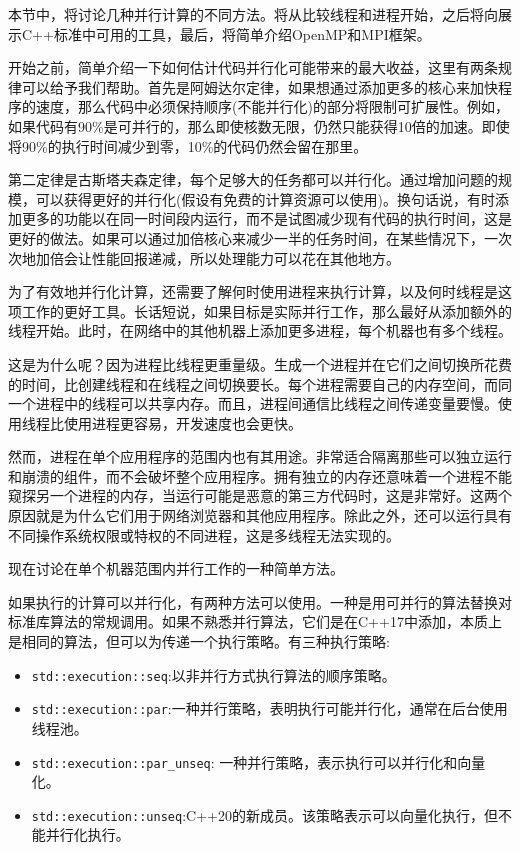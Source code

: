 
本节中，将讨论几种并行计算的不同方法。将从比较线程和进程开始，之后将向展示C++标准中可用的工具，最后，将简单介绍OpenMP和MPI框架。

开始之前，简单介绍一下如何估计代码并行化可能带来的最大收益，这里有两条规律可以给予我们帮助。首先是阿姆达尔定律，如果想通过添加更多的核心来加快程序的速度，那么代码中必须保持顺序(不能并行化)的部分将限制可扩展性。例如，如果代码有90\%是可并行的，那么即使核数无限，仍然只能获得10倍的加速。即使将90\%的执行时间减少到零，10\%的代码仍然会留在那里。

第二定律是古斯塔夫森定律，每个足够大的任务都可以并行化。通过增加问题的规模，可以获得更好的并行化(假设有免费的计算资源可以使用)。换句话说，有时添加更多的功能以在同一时间段内运行，而不是试图减少现有代码的执行时间，这是更好的做法。如果可以通过加倍核心来减少一半的任务时间，在某些情况下，一次次地加倍会让性能回报递减，所以处理能力可以花在其他地方。


为了有效地并行化计算，还需要了解何时使用进程来执行计算，以及何时线程是这项工作的更好工具。长话短说，如果目标是实际并行工作，那么最好从添加额外的线程开始。此时，在网络中的其他机器上添加更多进程，每个机器也有多个线程。

这是为什么呢？因为进程比线程更重量级。生成一个进程并在它们之间切换所花费的时间，比创建线程和在线程之间切换要长。每个进程需要自己的内存空间，而同一个进程中的线程可以共享内存。而且，进程间通信比线程之间传递变量要慢。使用线程比使用进程更容易，开发速度也会更快。

然而，进程在单个应用程序的范围内也有其用途。非常适合隔离那些可以独立运行和崩溃的组件，而不会破坏整个应用程序。拥有独立的内存还意味着一个进程不能窥探另一个进程的内存，当运行可能是恶意的第三方代码时，这是非常好。这两个原因就是为什么它们用于网络浏览器和其他应用程序。除此之外，还可以运行具有不同操作系统权限或特权的不同进程，这是多线程无法实现的。

现在讨论在单个机器范围内并行工作的一种简单方法。


如果执行的计算可以并行化，有两种方法可以使用。一种是用可并行的算法替换对标准库算法的常规调用。如果不熟悉并行算法，它们是在C++17中添加，本质上是相同的算法，但可以为传递一个执行策略。有三种执行策略:

\begin{itemize}
\item 
\texttt{std::execution::seq}:以非并行方式执行算法的顺序策略。

\item
\texttt{std::execution::par}:一种并行策略，表明执行可能并行化，通常在后台使用线程池。

\item
\texttt{std::execution::par\_unseq}: 一种并行策略，表示执行可以并行化和向量化。

\item
\texttt{std::execution::unseq}:C++20的新成员。该策略表示可以向量化执行，但不能并行化执行。
\end{itemize}

